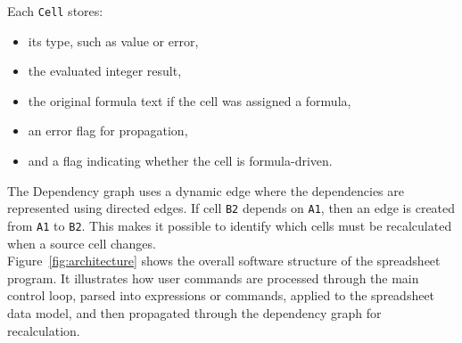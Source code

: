 \documentclass[12pt,a4paper]{article}
\begin{document}
\noindent Each \texttt{Cell} stores:
\begin{itemize}
    \item its type, such as value or error,
    \item the evaluated integer result,
    \item the original formula text if the cell was assigned a formula,
    \item an error flag for propagation,
    \item and a flag indicating whether the cell is formula-driven.
\end{itemize}

The Dependency graph uses a dynamic edge where the dependencies are represented using directed edges. If cell \texttt{B2} depends on \texttt{A1}, then an edge is created from \texttt{A1} to \texttt{B2}. This makes it possible to identify which cells must be recalculated when a source cell changes.\\[0.1cm]

Figure~\ref{fig:architecture} shows the overall software structure of the spreadsheet program. It illustrates how user commands are processed through the main control loop, parsed into expressions or commands, applied to the spreadsheet data model, and then propagated through the dependency graph for recalculation.
\end{document}
